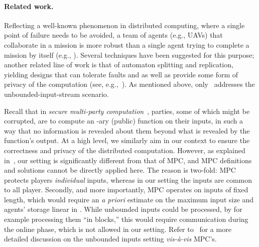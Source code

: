 \documentclass[letterpaper,11pt]{article}
\newcommand{\ignore}[1]{}
               {}
\begin{document}
\vspace{-.1in}

\paragraph{Related work.} 
Reflecting a well-known phenomenon in distributed computing, where
a single point of failure needs to be avoided,
a team of agents (e.g., UAVs)  that collaborate in a mission
is more robust than a single agent trying
to complete a mission by itself (e.g., \cite{Bamberger,BDDS10}). 
Several techniques have been  suggested for this purpose;
another related line of work is that of automaton splitting and
replication, yielding
designs that can tolerate faults and as well as provide
some form of privacy of the computation
(see, e.g.,~\cite{DKS07,DLY07,DGKPS10,DGGK09,DGGK11}).
As mentioned above, 
only~\cite{DGGK11}
addresses the unbounded-input-stream scenario.
\ignore{
Techniques for information-theoretic communication among the participants of 
such systems have been investigated as well~\cite{DO00,BD03,DGGN08,DGKPS10},
some of which might be amenable for enhancement and application to our
scenario as well.\todo{VLAD: which techniques can be amenable? We have unbounded-input non-interactive online phase}
} 



Recall that in {\em secure multi-party
computation}~\cite{DBLP:conf/stoc/GoldreichMW87,BGW88,CCD88}, 
parties, some of which might be corrupted, are to compute an -ary
(public) function on their inputs, in such a way that no information
is revealed about them beyond what is revealed by the function's
output.  At a high level, we similarly aim in our context to ensure
the correctness and privacy of the distributed computation. However,
as explained in~\cite{DGGK11}, our setting is significantly different
from that of MPC, and MPC definitions and solutions cannot be directly
applied here.  The reason is two-fold: MPC protects players {\em
individual} inputs, whereas in our setting the inputs are common to
all player.  Secondly, and more importantly, MPC operates on inputs of
fixed length, which would require an {\it a priori} estimate on the 
maximum input size  and agents' storage linear in .  
While unbounded inputs could be processed, 
by for example processing them ``in blocks,'' this would require
communication during the online phase, which is not allowed
in our setting. Refer to~\cite{DGGK11} for a more detailed discussion
on the unbounded inputs setting {\em vis-\`{a}-vis} MPC's.
\end{document}
